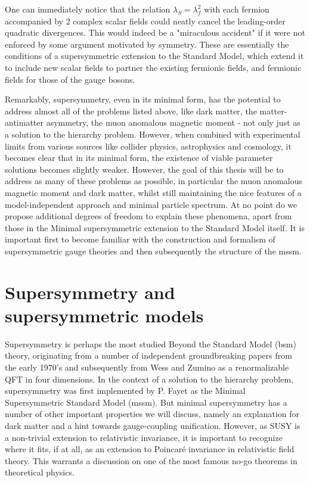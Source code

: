 \begin{itemize}
One can immediately notice that the relation $\lambda_{S} = \lambda^2_{f}$ with each fermion accompanied by 2 complex scalar fields could neatly cancel the leading-order quadratic divergences. This would indeed be a "miraculous accident" if it were not enforced by some argument motivated by symmetry. These are essentially the conditions of a supersymmetric extension to the Standard Model, which extend it to include new scalar fields to partner the existing fermionic fields, and fermionic fields for those of the gauge bosons.
\end{itemize}
Remarkably, supersymmetry, even in its minimal form, has the potential to address almost all of the problems listed above, like dark matter, the matter-antimatter asymmetry, the muon anomalous magnetic moment - not only just as a solution to the hierarchy problem. However, when combined with experimental limits from various sources like collider physics, astrophysics and cosmology, it becomes clear that in its minimal form, the existence of viable parameter solutions becomes slightly weaker. However, the goal of this thesis will be to address as many of these problems as possible, in particular the muon anomalous magnetic moment and dark matter, whilst still maintaining the nice features of a model-independent approach and minimal particle spectrum. At no point do we propose additional degrees of freedom to explain these phenomena, apart from those in the Minimal supersymmetric extension to the Standard Model itself. It is important first to become familiar with the construction and formalism of supersymmetric gauge theories and then subsequently the structure of the \acrshort{mssm}.

\section{Supersymmetry and supersymmetric models}
\label{sec:SUSY}
Supersymmetry is perhaps the most studied Beyond the Standard Model (\acrshort{bsm}) theory, originating from a number of independent groundbreaking papers from the early 1970's \cite{RN535,RN92} and subsequently from Wess and Zumino \cite{RN534} as a renormalizable QFT in four dimensions. In the context of a solution to the hierarchy problem, supersymmetry was first implemented by P. Fayet \cite{RN537} as the Minimal Supersymmetric Standard Model (\acrshort{mssm}). But minimal supersymmetry has a number of other important properties we will discuss, namely an explanation for dark matter and a hint towards gauge-coupling unification. However, as SUSY is a non-trivial extension to relativistic invariance, it is important to recognize where it fits, if at all, as an extension to Poincar\'{e} invariance in relativistic field theory. This warrants a discussion on one of the most famous no-go theorems in theoretical physics.

